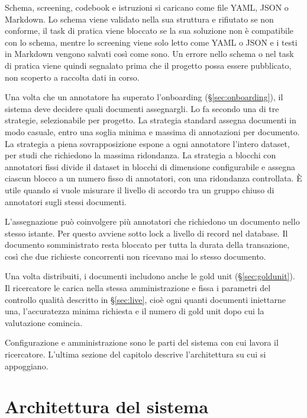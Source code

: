 \documentclass[]{sapthesis}
\begin{document}
Schema, screening, codebook e istruzioni si caricano come file YAML, JSON o Markdown. Lo schema viene validato nella sua struttura e rifiutato se non conforme, il task di pratica viene bloccato se la sua soluzione non è compatibile con lo schema, mentre lo screening viene solo letto come YAML o JSON e i testi in Markdown vengono salvati così come sono. Un errore nello schema o nel task di pratica viene quindi segnalato prima che il progetto possa essere pubblicato, non scoperto a raccolta dati in corso.

Una volta che un annotatore ha superato l'onboarding (\S\ref{sec:onboarding}), il sistema deve decidere quali documenti assegnargli. Lo fa secondo una di tre strategie, selezionabile per progetto. La strategia standard assegna documenti in modo casuale, entro una soglia minima e massima di annotazioni per documento. La strategia a piena sovrapposizione espone a ogni annotatore l'intero dataset, per studi che richiedono la massima ridondanza. La strategia a blocchi con annotatori fissi divide il dataset in blocchi di dimensione configurabile e assegna ciascun blocco a un numero fisso di annotatori, con una ridondanza controllata. È utile quando si vuole misurare il livello di accordo tra un gruppo chiuso di annotatori sugli stessi documenti.

L'assegnazione può coinvolgere più annotatori che richiedono un documento nello stesso istante. Per questo avviene sotto lock a livello di record nel database. Il documento somministrato resta bloccato per tutta la durata della transazione, così che due richieste concorrenti non ricevano mai lo stesso documento.

Una volta distribuiti, i documenti includono anche le gold unit (\S\ref{sec:goldunit}). Il ricercatore le carica nella stessa amministrazione e fissa i parametri del controllo qualità descritto in \S\ref{sec:live}, cioè ogni quanti documenti iniettarne una, l'accuratezza minima richiesta e il numero di gold unit dopo cui la valutazione comincia.

Configurazione e amministrazione sono le parti del sistema con cui lavora il ricercatore. L'ultima sezione del capitolo descrive l'architettura su cui si appoggiano.

\section{Architettura del sistema}
\label{sec:architettura}
\end{document}
